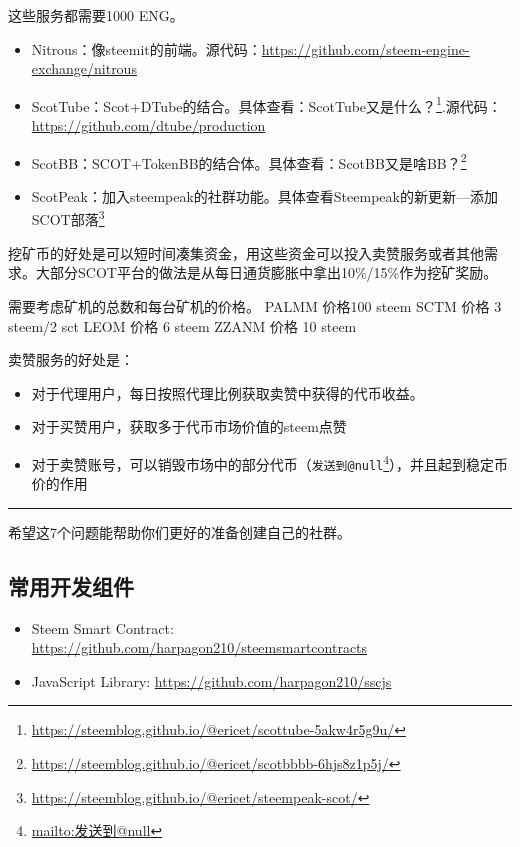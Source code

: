 \documentclass[]{ctexbook}
\providecommand{\tightlist}{%
  \setlength{\itemsep}{0pt}\setlength{\parskip}{0pt}}
\renewcommand{\href}[2]{#2\footnote{\url{#1}}}
\begin{document}
这些服务都需要1000 ENG。

\begin{itemize}
\tightlist
\item
  Nitrous：像steemit的前端。源代码：\url{https://github.com/steem-engine-exchange/nitrous}
\item
  ScotTube：Scot+DTube的结合。具体查看：\href{https://steemblog.github.io/@ericet/scottube-5akw4r5g9u/}{ScotTube又是什么？}.源代码：\url{https://github.com/dtube/production}
\item
  ScotBB：SCOT+TokenBB的结合体。具体查看：\href{https://steemblog.github.io/@ericet/scotbbbb-6hjs8z1p5j/}{ScotBB又是啥BB？}
\item
  ScotPeak：加入steempeak的社群功能。具体查看\href{https://steemblog.github.io/@ericet/steempeak-scot/}{Steempeak的新更新---添加SCOT部落}
\end{itemize}

挖矿币的好处是可以短时间凑集资金，用这些资金可以投入卖赞服务或者其他需求。大部分SCOT平台的做法是从每日通货膨胀中拿出10\%/15\%作为挖矿奖励。

需要考虑矿机的总数和每台矿机的价格。
PALMM 价格100 steem
SCTM 价格 3 steem/2 sct
LEOM 价格 6 steem
ZZANM 价格 10 steem

卖赞服务的好处是：

\begin{itemize}
\tightlist
\item
  对于代理用户，每日按照代理比例获取卖赞中获得的代币收益。
\item
  对于买赞用户，获取多于代币市场价值的steem点赞
\item
  对于卖赞账号，可以销毁市场中的部分代币（\href{mailto:发送到@null}{\nolinkurl{发送到@null}}），并且起到稳定币价的作用
\end{itemize}

\begin{center}\rule{0.5\linewidth}{\linethickness}\end{center}

希望这7个问题能帮助你们更好的准备创建自己的社群。

\subsection{常用开发组件}

\begin{itemize}
\tightlist
\item
  Steem Smart Contract: \url{https://github.com/harpagon210/steemsmartcontracts}
\item
  JavaScript Library: \url{https://github.com/harpagon210/sscjs}
\end{itemize}
\end{document}
